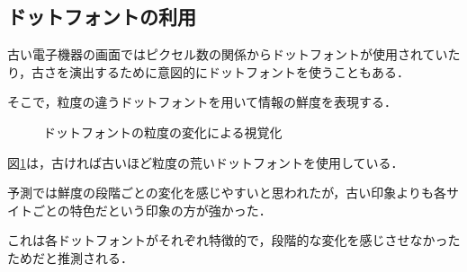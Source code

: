 \subsection{ドットフォントの利用}
\label{subsec:ver-fnt-dot}

古い電子機器の画面ではピクセル数の関係からドットフォントが使用されていたり，古さを演出するために意図的にドットフォントを使うこともある．

そこで，粒度の違うドットフォントを用いて情報の鮮度を表現する．

\begin{figure}[htbp]
  \begin{center}
  \end{center}
  \caption{ドットフォントの粒度の変化による視覚化}
  \label{fig:ver-dot}
\end{figure}

図\ref{fig:ver-dot}は，古ければ古いほど粒度の荒いドットフォントを使用している．

予測では鮮度の段階ごとの変化を感じやすいと思われたが，古い印象よりも各サイトごとの特色だという印象の方が強かった．

これは各ドットフォントがそれぞれ特徴的で，段階的な変化を感じさせなかったためだと推測される．
